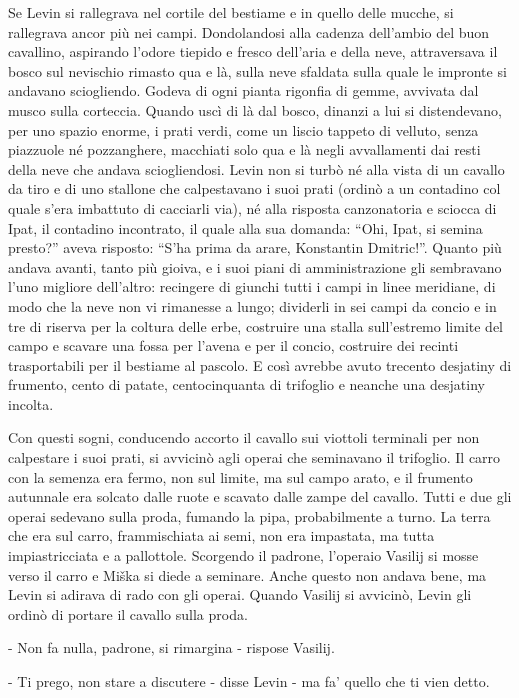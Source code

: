 Se Levin si rallegrava nel cortile del bestiame e in quello delle mucche, si rallegrava ancor più nei campi. Dondolandosi alla cadenza dell'ambio del buon cavallino, aspirando l'odore tiepido e fresco dell'aria e della neve, attraversava il bosco sul nevischio rimasto qua e là, sulla neve sfaldata sulla quale le impronte si andavano sciogliendo. Godeva di ogni pianta rigonfia di gemme, avvivata dal musco sulla corteccia. Quando uscì di là dal bosco, dinanzi a lui si distendevano, per uno spazio enorme, i prati verdi, come un liscio tappeto di velluto, senza piazzuole né pozzanghere, macchiati solo qua e là negli avvallamenti dai resti della neve che andava sciogliendosi. Levin non si turbò né alla vista di un cavallo da tiro e di uno stallone che calpestavano i suoi prati (ordinò a un contadino col quale s'era imbattuto di cacciarli via), né alla risposta canzonatoria e sciocca di Ipat, il contadino incontrato, il quale alla sua domanda: ``Ohi, Ipat, si semina presto?'' aveva risposto: ``S'ha prima da arare, Konstantin Dmitric!''. Quanto più andava avanti, tanto più gioiva, e i suoi piani di amministrazione gli sembravano l'uno migliore dell'altro: recingere di giunchi tutti i campi in linee meridiane, di modo che la neve non vi rimanesse a lungo; dividerli in sei campi da concio e in tre di riserva per la coltura delle erbe, costruire una stalla sull'estremo limite del campo e scavare una fossa per l'avena e per il concio, costruire dei recinti trasportabili per il bestiame al pascolo. E così avrebbe avuto trecento desjatiny di frumento, cento di patate, centocinquanta di trifoglio e neanche una desjatiny incolta. 

Con questi sogni, conducendo accorto il cavallo sui viottoli terminali per non calpestare i suoi prati, si avvicinò agli operai che seminavano il trifoglio. Il carro con la semenza era fermo, non sul limite, ma sul campo arato, e il frumento autunnale era solcato dalle ruote e scavato dalle zampe del cavallo. Tutti e due gli operai sedevano sulla proda, fumando la pipa, probabilmente a turno. La terra che era sul carro, frammischiata ai semi, non era impastata, ma tutta impiastricciata e a pallottole. Scorgendo il padrone, l'operaio Vasilij si mosse verso il carro e Miška si diede a seminare. Anche questo non andava bene, ma Levin si adirava di rado con gli operai. Quando Vasilij si avvicinò, Levin gli ordinò di portare il cavallo sulla proda. 

- Non fa nulla, padrone, si rimargina - rispose Vasilij. 

- Ti prego, non stare a discutere - disse Levin - ma fa' quello che ti vien detto. 

